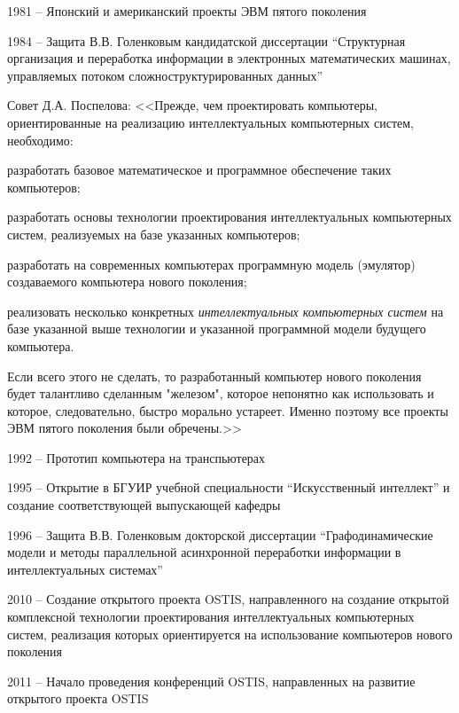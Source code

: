 \begin{textitemize}
\item 1981 -- Японский и американский проекты ЭВМ пятого поколения
\item 1984 -- Защита В.В. Голенковым кандидатской диссертации ``Структурная организация и переработка информации в электронных математических машинах, управляемых потоком сложноструктурированных данных''
\item Совет Д.А. Поспелова: <<Прежде, чем проектировать компьютеры, ориентированные на реализацию интеллектуальных компьютерных систем, необходимо:

	\begin{textitemize}
		\item разработать базовое математическое  и программное обеспечение таких компьютеров;
		\item разработать основы технологии проектирования интеллектуальных компьютерных систем, реализуемых на базе указанных компьютеров;
		\item разработать на современных компьютерах программную модель (эмулятор) создаваемого компьютера нового поколения;
		\item реализовать несколько конкретных \textit{интеллектуальных компьютерных систем} на базе указанной выше технологии и указанной программной модели будущего компьютера.
	\end{textitemize}
\vspace{-0.8\baselineskip}
Если всего этого не сделать, то разработанный компьютер нового поколения будет талантливо сделанным "железом"{}, которое непонятно как использовать и которое, следовательно, быстро морально устареет. Именно поэтому все проекты ЭВМ пятого поколения были обречены.>>
\vspace{0.5\baselineskip}
\item 1992 -- Прототип компьютера на транспьютерах
\item 1995 -- Открытие в БГУИР учебной специальности ``Искусственный интеллект'' и создание соответствующей выпускающей кафедры
\item 1996 -- Защита В.В. Голенковым докторской диссертации ``Графодинамические модели и методы параллельной асинхронной переработки информации в интеллектуальных системах''
\item 2010 -- Создание открытого проекта OSTIS, направленного на создание открытой комплексной технологии проектирования интеллектуальных компьютерных систем, реализация которых ориентируется на использование компьютеров нового поколения
\item 2011 -- Начало проведения  конференций OSTIS, направленных на развитие открытого проекта OSTIS

\end{textitemize}
